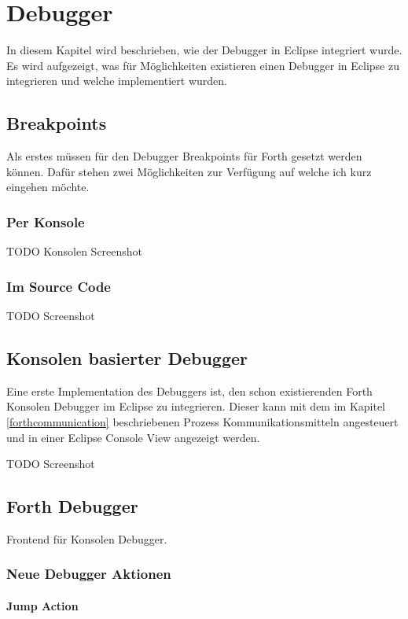 \chapter{Debugger}

In diesem Kapitel wird beschrieben, wie der Debugger in Eclipse integriert wurde. Es wird aufgezeigt, was für Möglichkeiten existieren einen Debugger in Eclipse zu integrieren und welche implementiert wurden.

\section{Breakpoints}
Als erstes müssen für den Debugger Breakpoints für Forth gesetzt werden können. Dafür stehen zwei Möglichkeiten zur Verfügung auf welche ich kurz eingehen möchte.

\subsection{Per Konsole}

TODO Konsolen Screenshot

\subsection{Im Source Code}

TODO Screenshot

\section{Konsolen basierter Debugger}

Eine erste Implementation des Debuggers ist, den schon existierenden Forth Konsolen Debugger im Eclipse zu integrieren. Dieser kann mit dem im Kapitel \ref{forthcommunication} beschriebenen Prozess Kommunikationsmitteln angesteuert und in einer Eclipse Console View angezeigt werden.

TODO Screenshot

\section{Forth Debugger}

Frontend für Konsolen Debugger.

\subsection{Neue Debugger Aktionen}

\subsubsection{Jump Action}

